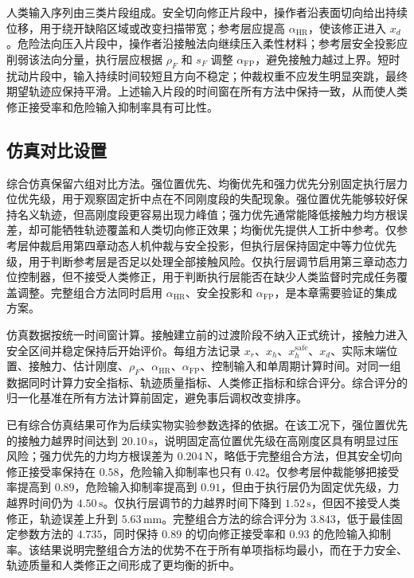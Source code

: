 人类输入序列由三类片段组成。安全切向修正片段中，操作者沿表面切向给出持续位移，用于绕开缺陷区域或改变扫描带宽；参考层应提高 $\alpha_{\mathrm{HR}}$，使该修正进入 $x_d$。危险法向压入片段中，操作者沿接触法向继续压入柔性材料；参考层安全投影应削弱该法向分量，执行层应根据 $\rho_F$ 和 $s_F$ 调整 $\alpha_{\mathrm{FP}}$，避免接触力越过上界。短时扰动片段中，输入持续时间较短且方向不稳定；仲裁权重不应发生明显突跳，最终期望轨迹应保持平滑。上述输入片段的时间窗在所有方法中保持一致，从而使人类修正接受率和危险输入抑制率具有可比性。

\subsection{仿真对比设置}
\label{subsec:ch5_simulation_method_setting}

综合仿真保留六组对比方法。强位置优先、均衡优先和强力优先分别固定执行层力位优先级，用于观察固定折中点在不同刚度段的失配现象。强位置优先能够较好保持名义轨迹，但高刚度段更容易出现力峰值；强力优先通常能降低接触力均方根误差，却可能牺牲轨迹覆盖和人类切向修正效果；均衡优先提供人工折中参考。仅参考层仲裁启用第四章动态人机仲裁与安全投影，但执行层保持固定中等力位优先级，用于判断参考层是否足以处理全部接触风险。仅执行层调节启用第三章动态力位控制器，但不接受人类修正，用于判断执行层能否在缺少人类监督时完成任务覆盖调整。完整组合方法同时启用 $\alpha_{\mathrm{HR}}$、安全投影和 $\alpha_{\mathrm{FP}}$，是本章需要验证的集成方案。

仿真数据按统一时间窗计算。接触建立前的过渡阶段不纳入正式统计，接触力进入安全区间并稳定保持后开始评价。每组方法记录 $x_r$、$x_h$、$x_h^{\mathrm{safe}}$、$x_d$、实际末端位置、接触力、估计刚度、$\rho_F$、$\alpha_{\mathrm{HR}}$、$\alpha_{\mathrm{FP}}$、控制输入和单周期计算时间。对同一组数据同时计算力安全指标、轨迹质量指标、人类修正指标和综合评分。综合评分的归一化基准在所有方法计算前固定，避免事后调权改变排序。

已有综合仿真结果可作为后续实物实验参数选择的依据。在该工况下，强位置优先的接触力越界时间达到 $20.10\,\mathrm{s}$，说明固定高位置优先级在高刚度区具有明显过压风险；强力优先的力均方根误差为 $0.204\,\mathrm{N}$，略低于完整组合方法，但其安全切向修正接受率保持在 $0.58$，危险输入抑制率也只有 $0.42$。仅参考层仲裁能够把接受率提高到 $0.89$，危险输入抑制率提高到 $0.91$，但由于执行层仍为固定优先级，力越界时间仍为 $4.50\,\mathrm{s}$。仅执行层调节的力越界时间下降到 $1.52\,\mathrm{s}$，但因不接受人类修正，轨迹误差上升到 $5.63\,\mathrm{mm}$。完整组合方法的综合评分为 $3.843$，低于最佳固定参数方法的 $4.735$，同时保持 $0.89$ 的切向修正接受率和 $0.93$ 的危险输入抑制率。该结果说明完整组合方法的优势不在于所有单项指标均最小，而在于力安全、轨迹质量和人类修正之间形成了更均衡的折中。

